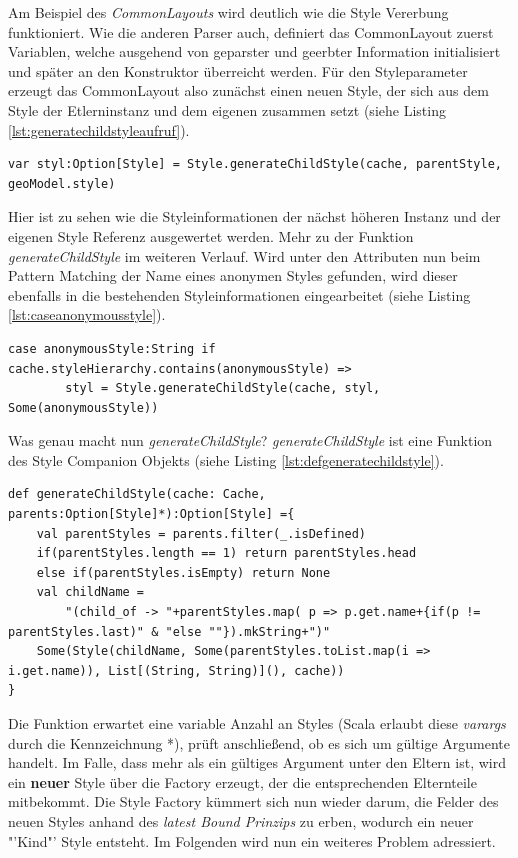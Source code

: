 Am Beispiel des \textit{CommonLayouts} wird deutlich wie die Style Vererbung funktioniert.
Wie die anderen Parser auch, definiert das CommonLayout zuerst Variablen, welche ausgehend von geparster und geerbter Information initialisiert und später an den Konstruktor überreicht werden. Für den Styleparameter erzeugt das CommonLayout also zunächst einen neuen Style, der sich aus dem Style der Etlerninstanz und dem eigenen zusammen setzt (siehe Listing \ref{lst:generatechildstyleaufruf}).
\begin{lstlisting}[style=scala, caption = {Erzeugen eines neuen Styles über andere Styleinstanzen}, label = {lst:generatechildstyleaufruf}]
var styl:Option[Style] = Style.generateChildStyle(cache, parentStyle, geoModel.style)
\end{lstlisting}
Hier ist zu sehen wie die Styleinformationen der nächst höheren Instanz und der eigenen Style Referenz ausgewertet werden. Mehr zu der Funktion \textit{generateChildStyle} im weiteren Verlauf. Wird unter den Attributen nun beim Pattern Matching der Name eines anonymen Styles gefunden, wird dieser ebenfalls in die bestehenden Styleinformationen eingearbeitet (siehe Listing \ref{lst:caseanonymousstyle}).
\begin{lstlisting}[style=scala, caption = {Erzeugen von Kindstyles}, label = {lst:caseanonymousstyle}]
case anonymousStyle:String if cache.styleHierarchy.contains(anonymousStyle) =>
        styl = Style.generateChildStyle(cache, styl, Some(anonymousStyle))
\end{lstlisting}Was genau macht nun \textit{generateChildStyle}?
\textit{generateChildStyle} ist eine Funktion des Style Companion Objekts (siehe Listing \ref{lst:defgeneratechildstyle}).
\begin{lstlisting}[style=scala, caption = {Funktion generateChildStyle}, label = {lst:defgeneratechildstyle}]
def generateChildStyle(cache: Cache, parents:Option[Style]*):Option[Style] ={
    val parentStyles = parents.filter(_.isDefined)
    if(parentStyles.length == 1) return parentStyles.head
    else if(parentStyles.isEmpty) return None
    val childName =
        "(child_of -> "+parentStyles.map( p => p.get.name+{if(p != parentStyles.last)" & "else ""}).mkString+")"
    Some(Style(childName, Some(parentStyles.toList.map(i => i.get.name)), List[(String, String)](), cache))
}
\end{lstlisting}Die Funktion erwartet eine variable Anzahl an Styles (Scala erlaubt diese \textit{varargs} durch die Kennzeichnung *), prüft anschließend, ob es sich um gültige Argumente handelt. Im Falle, dass mehr als ein gültiges Argument unter den Eltern ist, wird ein \textbf{neuer} Style über die Factory erzeugt, der die entsprechenden Elternteile mitbekommt. Die Style Factory kümmert sich nun wieder darum, die Felder des neuen Styles anhand des \textit{latest Bound Prinzips} zu erben, wodurch ein neuer "'Kind"' Style entsteht.
Im Folgenden wird nun ein weiteres Problem adressiert.
